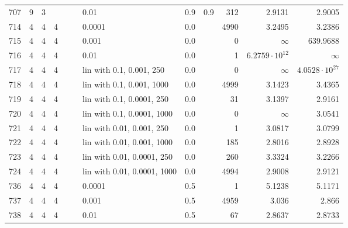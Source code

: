 \begin{longtable}{lrrrrrlrrrrr}
 707 &       9 & 3 &   &   &   &                        0.01 &  0.9 &    0.9 &     312 &                 2.9131 &                 2.9005 \\
 714 &       4 & 4 & 4 &   &   &                      0.0001 &  0.0 &        &    4990 &                 3.2495 &                 3.2386 \\
 715 &       4 & 4 & 4 &   &   &                       0.001 &  0.0 &        &       0 &               $\infty$ &               639.9688 \\
 716 &       4 & 4 & 4 &   &   &                        0.01 &  0.0 &        &       1 &  $6.2759\cdot 10^{12}$ &               $\infty$ \\
 717 &       4 & 4 & 4 &   &   &    lin with 0.1, 0.001, 250 &  0.0 &        &       0 &               $\infty$ &  $4.0528\cdot 10^{27}$ \\
 718 &       4 & 4 & 4 &   &   &   lin with 0.1, 0.001, 1000 &  0.0 &        &    4999 &                 3.1423 &                 3.4365 \\
 719 &       4 & 4 & 4 &   &   &   lin with 0.1, 0.0001, 250 &  0.0 &        &      31 &                 3.1397 &                 2.9161 \\
 720 &       4 & 4 & 4 &   &   &  lin with 0.1, 0.0001, 1000 &  0.0 &        &       0 &               $\infty$ &                 3.0541 \\
 721 &       4 & 4 & 4 &   &   &   lin with 0.01, 0.001, 250 &  0.0 &        &       1 &                 3.0817 &                 3.0799 \\
 722 &       4 & 4 & 4 &   &   &  lin with 0.01, 0.001, 1000 &  0.0 &        &     185 &                 2.8016 &                 2.8928 \\
 723 &       4 & 4 & 4 &   &   &  lin with 0.01, 0.0001, 250 &  0.0 &        &     260 &                 3.3324 &                 3.2266 \\
 724 &       4 & 4 & 4 &   &   & lin with 0.01, 0.0001, 1000 &  0.0 &        &    4994 &                 2.9008 &                 2.9121 \\
 736 &       4 & 4 & 4 &   &   &                      0.0001 &  0.5 &        &       1 &                 5.1238 &                 5.1171 \\
 737 &       4 & 4 & 4 &   &   &                       0.001 &  0.5 &        &    4959 &                  3.036 &                  2.866 \\
 738 &       4 & 4 & 4 &   &   &                        0.01 &  0.5 &        &      67 &                 2.8637 &                 2.8733 \\

\end{longtable}
